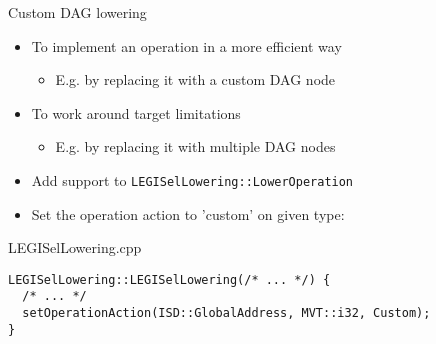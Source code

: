 
\begin{frame}[fragile]{Custom DAG lowering}

\begin{itemize}
    \item To implement an operation in a more efficient way
    \begin{itemize}
        \item E.g. by replacing it with a custom DAG node
    \end{itemize}
    \item To work around target limitations
    \begin{itemize}
        \item E.g. by replacing it with multiple DAG nodes
    \end{itemize}
    \item Add support to \texttt{LEGISelLowering::LowerOperation}
    \item Set the operation action to 'custom' on given type:
\end{itemize}

\begin{block}{LEGISelLowering.cpp}
\begin{lstlisting}
LEGISelLowering::LEGISelLowering(/* ... */) {
  /* ... */
  setOperationAction(ISD::GlobalAddress, MVT::i32, Custom);
}
\end{lstlisting}
\end{block}

\end{frame}


